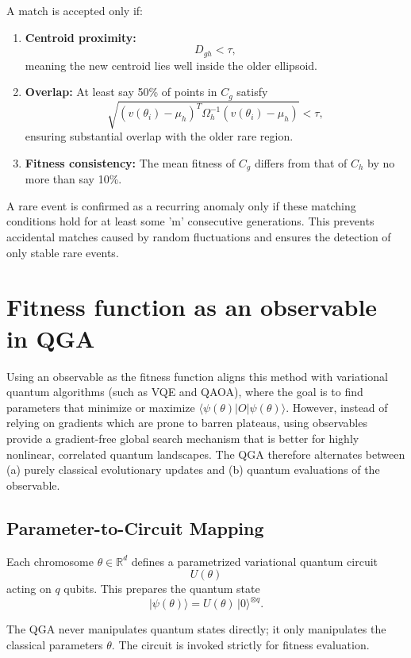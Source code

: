\documentclass{article}
\begin{document}
A match is accepted only if:
\begin{enumerate}
    \item \textbf{Centroid proximity:}
    \[
    D_{gh} < \tau,
    \]
    meaning the new centroid lies well inside the older ellipsoid.
    \item \textbf{Overlap:} At least say 50\% of points in $C_g$ satisfy
    \[
    \sqrt{(v(\theta_i)-\mu_h)^T \Omega_h^{-1}(v(\theta_i)-\mu_h)} < \tau,
    \]
    ensuring substantial overlap with the older rare region.
    \item \textbf{Fitness consistency:} The mean fitness of $C_g$ differs from that of $C_h$ by no more than say
    10\%.
\end{enumerate}

A rare event is confirmed as a recurring anomaly only if these matching conditions hold for at least some 'm' consecutive generations. This prevents accidental matches caused by random fluctuations and ensures the detection
of only stable rare events.



\section{Fitness function as an observable in QGA}

Using an observable as the fitness function aligns this method with variational quantum algorithms (such as VQE and QAOA), where the goal is to find parameters that minimize or maximize $\langle \psi(\theta)|O|\psi(\theta)\rangle$. However, instead of relying on gradients which are prone to barren plateaus, using observables provide a gradient-free global search mechanism that is better for highly nonlinear, correlated quantum landscapes.
The QGA therefore alternates between (a) purely classical evolutionary updates and (b) quantum evaluations of the observable.

\subsection*{Parameter-to-Circuit Mapping}
Each chromosome $\theta \in \mathbb{R}^d$ defines a parametrized variational quantum circuit
\[
U(\theta)
\]
acting on $q$ qubits. This prepares the quantum state
\[
|\psi(\theta)\rangle = U(\theta)\,|0\rangle^{\otimes q}.
\]

The QGA never manipulates quantum states directly; it only manipulates the classical parameters $\theta$. The circuit is invoked strictly for fitness evaluation.
\end{document}
